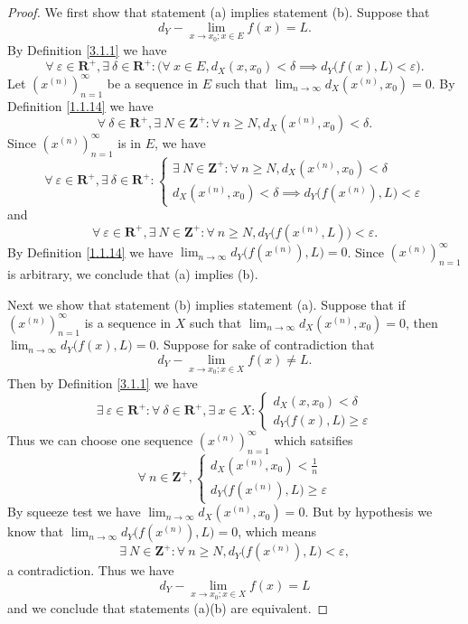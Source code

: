 \begin{proof}
    We first show that statement (a) implies statement (b).
    Suppose that
    \[
        d_Y - \lim_{x \to x_0 ; x \in E} f(x) = L.
    \]
    By Definition \ref{3.1.1} we have
    \[
        \forall\ \varepsilon \in \mathbf{R}^+, \exists\ \delta \in \mathbf{R}^+ : \Big(\forall\ x \in E, d_X(x, x_0) < \delta \implies d_Y\big(f(x), L\big) < \varepsilon\Big).
    \]
    Let \((x^{(n)})_{n = 1}^\infty\) be a sequence in \(E\) such that \(\lim_{n \to \infty} d_X(x^{(n)}, x_0) = 0\).
    By Definition \ref{1.1.14} we have
    \[
        \forall\ \delta \in \mathbf{R}^+, \exists\ N \in \mathbf{Z}^+ : \forall\ n \geq N, d_X(x^{(n)}, x_0) < \delta.
    \]
    Since \((x^{(n)})_{n = 1}^\infty\) is in \(E\), we have
    \[
        \forall\ \varepsilon \in \mathbf{R}^+, \exists\ \delta \in \mathbf{R}^+ : \begin{cases}
            \exists\ N \in \mathbf{Z}^+ : \forall\ n \geq N, d_X(x^{(n)}, x_0) < \delta \\
            d_X(x^{(n)}, x_0) < \delta \implies d_Y\big(f(x^{(n)}), L\big) < \varepsilon
        \end{cases}
    \]
    and
    \[
        \forall\ \varepsilon \in \mathbf{R}^+, \exists\ N \in \mathbf{Z}^+ : \forall\ n \geq N, d_Y\big(f(x^{(n)}, L)\big) < \varepsilon.
    \]
    By Definition \ref{1.1.14} we have \(\lim_{n \to \infty} d_Y\big(f(x^{(n)}), L\big) = 0\).
    Since \((x^{(n)})_{n = 1}^\infty\) is arbitrary, we conclude that (a) implies (b).

    Next we show that statement (b) implies statement (a).
    Suppose that if \((x^{(n)})_{n = 1}^\infty\) is a sequence in \(X\) such that \(\lim_{n \to \infty} d_X(x^{(n)}, x_0) = 0\), then \(\lim_{n \to \infty} d_Y\big(f(x), L\big) = 0\).
    Suppose for sake of contradiction that
    \[
        d_Y - \lim_{x \to x_0 ; x \in X} f(x) \neq L.
    \]
    Then by Definition \ref{3.1.1} we have
    \[
        \exists\ \varepsilon \in \mathbf{R}^+ : \forall\ \delta \in \mathbf{R}^+, \exists\ x \in X : \begin{cases}
            d_X(x, x_0) < \delta \\
            d_Y\big(f(x), L\big) \geq \varepsilon
        \end{cases}
    \]
    Thus we can choose one sequence \((x^{(n)})_{n = 1}^\infty\) which satsifies
    \[
        \forall\ n \in \mathbf{Z}^+, \begin{cases}
            d_X(x^{(n)}, x_0) < \frac{1}{n} \\
            d_Y\big(f(x^{(n)}), L\big) \geq \varepsilon
        \end{cases}
    \]
    By squeeze test we have \(\lim_{n \to \infty} d_X(x^{(n)}, x_0) = 0\).
    But by hypothesis we know that \(\lim_{n \to \infty} d_Y\big(f(x^{(n)}), L\big) = 0\), which means
    \[
        \exists\ N \in \mathbf{Z}^+ : \forall\ n \geq N, d_Y\big(f(x^{(n)}), L\big) < \varepsilon,
    \]
    a contradiction.
    Thus we have
    \[
        d_Y - \lim_{x \to x_0 ; x \in X} f(x) = L
    \]
    and we conclude that statements (a)(b) are equivalent.


\end{proof}
